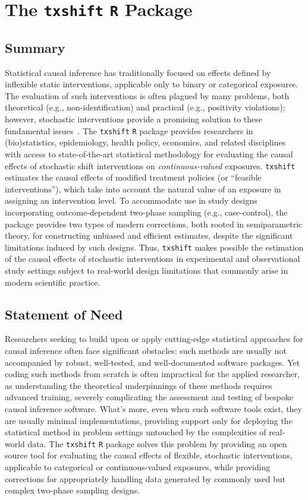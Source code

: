 \section{The \texttt{txshift} \texttt{R} Package}

\subsection{Summary}

Statistical causal inference has traditionally focused on effects defined by
inflexible static interventions, applicable only to binary or categorical
exposures. The evaluation of such interventions is often plagued by many
problems, both theoretical (e.g., non-identification) and practical (e.g.,
positivity violations); however, stochastic interventions provide a promising
solution to these fundamental issues~\citep{diaz2018stochastic}. The
\texttt{txshift} \texttt{R} package provides researchers in (bio)statistics,
epidemiology, health policy, economics, and related disciplines with access to
state-of-the-art statistical methodology for evaluating the causal effects of
stochastic shift interventions on \textit{continuous-valued} exposures.
\texttt{txshift} estimates the causal effects of modified treatment policies (or
``feasible interventions''), which take into account the natural value of an
exposure in assigning an intervention level. To accommodate use in study designs
incorporating outcome-dependent two-phase sampling (e.g., case-control), the
package provides two types of modern corrections, both rooted in semiparametric
theory, for constructing unbiased and efficient estimates, despite the
significant limitations induced by such designs. Thus, \texttt{txshift} makes
possible the estimation of the causal effects of stochastic interventions in
experimental and observational study settings subject to real-world design
limitations that commonly arise in modern scientific practice.

\subsection{Statement of Need}

Researchers seeking to build upon or apply cutting-edge statistical approaches
for causal inference often face significant obstacles: such methods are usually
not accompanied by robust, well-tested, and well-documented software packages.
Yet coding such methods from scratch is often impractical for the applied
researcher, as understanding the theoretical underpinnings of these methods
requires advanced training, severely complicating the assessment and testing of
bespoke causal inference software. What's more, even when such software tools
exist, they are usually minimal implementations, providing support only for
deploying the statistical method in problem settings untouched by the
complexities of real-world data. The \texttt{txshift} \texttt{R} package solves
this problem by providing an open source tool for evaluating the causal effects
of flexible, stochastic interventions, applicable to categorical or
continuous-valued exposures, while providing corrections for appropriately
handling data generated by commonly used but complex two-phase sampling designs.

